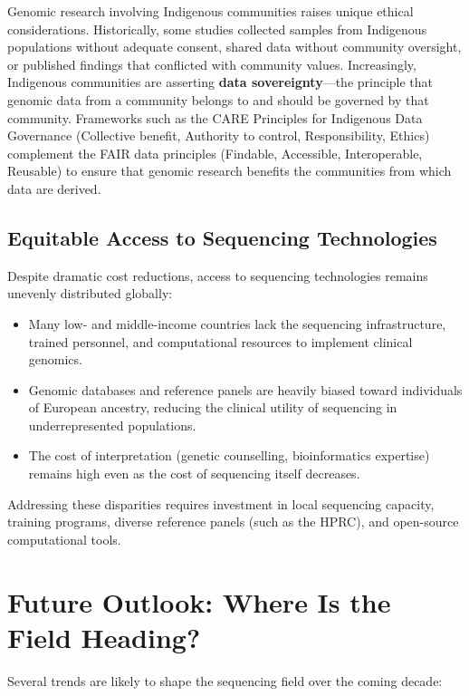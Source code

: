 Genomic research involving Indigenous communities raises unique ethical considerations. Historically, some studies collected samples from Indigenous populations without adequate consent, shared data without community oversight, or published findings that conflicted with community values. Increasingly, Indigenous communities are asserting \textbf{data sovereignty}---the principle that genomic data from a community belongs to and should be governed by that community. Frameworks such as the CARE Principles for Indigenous Data Governance (Collective benefit, Authority to control, Responsibility, Ethics) complement the FAIR data principles (Findable, Accessible, Interoperable, Reusable) to ensure that genomic research benefits the communities from which data are derived.

\subsection{Equitable Access to Sequencing Technologies}
\label{subsec:emerging:equity}

Despite dramatic cost reductions, access to sequencing technologies remains unevenly distributed globally:

\begin{itemize}[itemsep=2pt]
  \item Many low- and middle-income countries lack the sequencing infrastructure, trained personnel, and computational resources to implement clinical genomics.
  \item Genomic databases and reference panels are heavily biased toward individuals of European ancestry, reducing the clinical utility of sequencing in underrepresented populations.
  \item The cost of interpretation (genetic counselling, bioinformatics expertise) remains high even as the cost of sequencing itself decreases.
\end{itemize}

Addressing these disparities requires investment in local sequencing capacity, training programs, diverse reference panels (such as the HPRC), and open-source computational tools.


\section{Future Outlook: Where Is the Field Heading?}
\label{sec:emerging:future}

Several trends are likely to shape the sequencing field over the coming decade:

